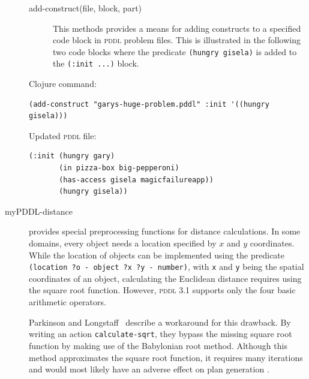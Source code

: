 \documentclass[runningheads]{llncs}
\newcommand{\pddl}{\textsc{pddl}\xspace}
\begin{document}
\begin{description}
\begin{description}
\item[{add-construct(file, block, part)}] This methods provides a
  means for adding constructs to a specified code block in \pddl
  problem files. This is illustrated in the following two code blocks
  where the predicate \texttt{(hungry gisela)} is added to the
  \texttt{(:init~...)} block.
\end{description}
Clojure command:
\begin{verbatim}
(add-construct "garys-huge-problem.pddl" :init '((hungry gisela)))
\end{verbatim}
Updated \pddl file:
\begin{verbatim}
(:init (hungry gary)
       (in pizza-box big-pepperoni)
       (has-access gisela magicfailureapp))
       (hungry gisela))
\end{verbatim}


\item[myPDDL-distance] provides special preprocessing functions for
  distance calculations. In some domains, every object needs a
  location specified by $x$ and $y$ coordinates.  While the location
  of objects can be implemented using the predicate \texttt{(location
    ?o - object ?x ?y - number)}, with \texttt{x} and \texttt{y} being
  the spatial coordinates of an object, calculating the Euclidean
  distance requires using the square root function. However, \pddl 3.1
  supports only the four basic arithmetic operators.

  Parkinson and Longstaff~\cite{parkinson2012increasing} describe a
  workaround for this drawback. By writing an action
  \texttt{calculate-sqrt}, they bypass the missing square root
  function by making use of the Babylonian root method. Although this
  method approximates the square root function, it requires many
  iterations and would most likely have an adverse effect on plan
  generation \cite{parkinson2012increasing}.


\end{description}
\end{document}
